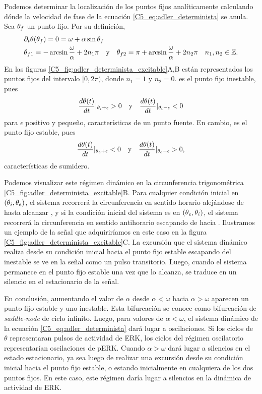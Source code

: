 \documentclass[./main.tex]{subfiles}
\begin{document}
Podemos determinar la localización de los puntos fijos analíticamente calculando dónde la velocidad de fase de la ecuación \ref{C5_eq:adler_determinista} se anula. Sea $\theta_f$ un punto fijo. Por su definición,  
\begin{align}
    &\partial_t \theta (\xx_f) = 0 = \omega + \alpha \sin{\xx_f} \nonumber \\
    &\xx_{f1} = -\arcsin{\frac{\omega}{\alpha}} + 2 n_1 \pi \quad \text{y} \quad
     \xx_{f2} = \pi + \arcsin{\frac{\omega}{\alpha}} + 2 n_2  \pi \quad n_1,n_2 \in \mathbb{Z}. 
    \label{C5_eq:PF_def}
\end{align}
En las figuras \ref{C5_fig:adler_determinista_excitable}A,B están representados los puntos fijos del intervalo $[0,2\pi)$, donde $n_1 = 1$ y $n_2 = 0$. \xxi es el punto fijo inestable, pues 
\begin{align*}
    \frac{d\theta(t)}{dt}|_{\theta_i+\epsilon} > 0 \quad \text{y} \quad \frac{d\theta(t)}{dt}|_{\theta_i-\epsilon} < 0
\end{align*}
 para $\epsilon$ positivo y pequeño, características de un punto fuente. En cambio, \xxe es el punto fijo estable, pues
 \begin{align*}
    \frac{d\theta(t)}{dt}|_{\theta_e+\epsilon} < 0 \quad \text{y} \quad \frac{d\theta(t)}{dt}|_{\theta_e-\epsilon} > 0,
\end{align*}
características de sumidero.


Podemos visualizar este régimen dinámico en la circunferencia trigonométrica \ref{C5_fig:adler_determinista_excitable}B. Para cualquier condición inicial en $(\theta_i,\theta_e)$, el sistema recorrerá la circunferencia en sentido horario alejándose de \xxi hasta alcanzar \xxe, y si la condición inicial del sistema es en $(\theta_e,\theta_i)$, el sistema recorrerá la circunferencia en sentido antihorario escapando de \xxi hacia \xxe. Ilustramos un ejemplo de la señal que adquiriríamos en este caso en la figura \ref{C5_fig:adler_determinista_excitable}C. La excursión que el sistema dinámico realiza desde su condición inicial hacia el punto fijo estable escapando del inestable se ve en la señal como un pulso transitorio. Luego, cuando el sistema permanece en el punto fijo estable una vez que lo alcanza, se traduce en un silencio en el estacionario de la señal.  


En conclusión, aumentando el valor de $\alpha$ desde $\alpha < \omega$ hacia $\alpha > \omega$ aparecen un punto fijo estable y uno inestable. Esta bifurcación se conoce como bifurcación de \textit{saddle-node} de ciclo infinito. Luego, para valores de $\alpha < \omega$, el sistema dinámico de la ecuación \ref{C5_eq:adler_determinista} dará lugar a oscilaciones. Si los ciclos de $\theta$ representaran pulsos de actividad de ERK, los ciclos del régimen oscilatorio representarían oscilaciones de pERK. Cuando $\alpha > \omega$ dará lugar a silencios en el estado estacionario, ya sea luego de realizar una excursión desde su condición inicial hacia el punto fijo estable, o estando inicialmente en cualquiera de los dos puntos fijos. En este caso, este régimen daría lugar a silencios en la dinámica de actividad de ERK. 
\end{document}
